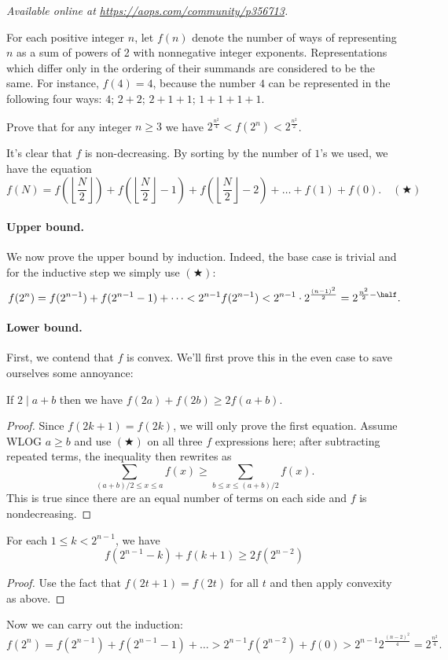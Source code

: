 
\textsl{Available online at \url{https://aops.com/community/p356713}.}
\begin{mdframed}[style=mdpurplebox,frametitle={Problem statement}]
For each positive integer $n$,
let $f(n)$ denote the number of ways of representing $n$
as a sum of powers of 2 with nonnegative integer exponents.
Representations which differ only in the ordering
of their summands are considered to be the same.
For instance, $f(4) = 4$,
because the number $4$ can be represented in the following four ways:
$4$; $2+2$; $2+1+1$; $1+1+1+1$.

Prove that for any integer $n \geq 3$
we have $2^{\frac{n^2}{4}} < f(2^n) < 2^{\frac{n^2}2}$.
\end{mdframed}
It's clear that $f$ is non-decreasing.
By sorting by the number of $1$'s we used,
we have the equation
\[ f(N) =
  f\left( \left\lfloor \frac N2 \right\rfloor \right)
  +  f\left( \left\lfloor \frac N2 \right\rfloor -1 \right)
  +  f\left( \left\lfloor \frac N2 \right\rfloor -2 \right)
  + \dots
  + f(1) + f(0). \quad (\bigstar)
\]

\paragraph{Upper bound.}
We now prove the upper bound by induction.
Indeed, the base case is trivial and for the inductive step
we simply use $(\bigstar)$:
\[ f(2^n) = f(2^{n-1}) + f(2^{n-1}-1) + \dots
  < 2^{n-1} f(2^{n-1})
  < 2^{n-1} \cdot 2^{\frac{(n-1)^2}{2}}
  = 2^{\frac{n^2}{2} - \half}.
\]

\paragraph{Lower bound.}
First, we contend that $f$ is convex.
We'll first prove this in the even case
to save ourselves some annoyance:
\begin{claim*}
  If $2 \mid a+b$ then
  we have $f(2a) + f(2b) \ge 2 f\left( a+b \right)$.
\end{claim*}
\begin{proof}
  Since $f(2k+1) = f(2k)$, we will only prove the first equation.
  Assume WLOG $a \ge b$ and use
  $(\bigstar)$ on all three $f$ expressions here;
  after subtracting repeated terms, the inequality then rewrites as
  \[ \sum_{(a+b)/2 \le x \le a} f(x)
    \ge \sum_{b \le x \le (a+b)/2} f(x). \]
  This is true since there are an equal number of terms on each side
  and $f$ is nondecreasing.
\end{proof}
\begin{claim*}
  For each $1 \le k < 2^{n-1}$, we have
  \[ f(2^{n-1} - k) + f(k+1) \ge 2f(2^{n-2}) \]
\end{claim*}
\begin{proof}
  Use the fact that $f(2t+1)=f(2t)$ for all $t$
  and then apply convexity as above.
\end{proof}
Now we can carry out the induction:
\[ f(2^n) = f(2^{n-1}) + f(2^{n-1}-1) + \dots
  > 2^{n-1} f(2^{n-2}) + f(0)
  > 2^{n-1} 2^{\frac{(n-2)^2}{4}} = 2^{\frac{n^2}{4}}.
\]
\pagebreak



